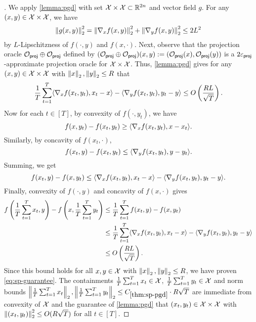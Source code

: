 \begin{proof}[]
We apply \cref{lemma:pgd} with set $\mathcal{X} \times \mathcal{X} \subset \mathbb{R}^{2n}$ and vector field $g$. For any $(x,y) \in \mathcal{X} \times \mathcal{X}$, we have
\[\left \lVert g(x,y) \right \rVert_2^2 = \left \lVert \nabla_x f(x,y) \right \rVert_2^2 + \left \lVert \nabla_y f(x,y) \right \rVert_2^2 \leq 2L^2\]
by $L$-Lipschitzness of $f(\cdot,y)$ and $f(x,\cdot)$. Next, observe that the projection oracle $\mathcal{O}_{\mathsf{proj}} \oplus \mathcal{O}_{\mathsf{proj}}$ defined by $(\mathcal{O}_{\mathsf{proj}} \oplus \mathcal{O}_{\mathsf{proj}})(x,y) := (\mathcal{O}_{\mathsf{proj}}(x),\mathcal{O}_{\mathsf{proj}}(y))$ is a $2\varepsilon_{\mathsf{proj}}$-approximate projection oracle for $\mathcal{X}\times\mathcal{X}$. Thus, \cref{lemma:pgd} gives for any $(x,y) \in \mathcal{X}\times\mathcal{X}$ with $\left \lVert x \right \rVert_2,\left \lVert y \right \rVert_2 \leq R$ that
\[\frac{1}{T}\sum_{t=1}^T \langle \nabla_x f(x_t,y_t), x_t - x\rangle - \langle \nabla_y f(x_t,y_t), y_t - y\rangle \leq O\left(\frac{RL}{\sqrt{T}}\right).\]
Now for each $t \in [T]$, by convexity of $f(\cdot,y_t)$, we have
\[f(x,y_t) - f(x_t,y_t) \geq \langle \nabla_x f(x_t,y_t), x - x_t\rangle.\]
Similarly, by concavity of $f(x_t,\cdot)$,
\[f(x_t, y) - f(x_t,y_t) \leq \langle \nabla_y f(x_t,y_t), y - y_t\rangle.\]
Summing, we get
\[f(x_t,y) - f(x,y_t) \leq \langle \nabla_x f(x_t,y_t), x_t - x\rangle - \langle \nabla_y f(x_t,y_t), y_t - y\rangle.\]
Finally, convexity of $f(\cdot,y)$ and concavity of $f(x,\cdot)$ gives
\begin{align}
f\left(\frac{1}{T}\sum_{t=1}^T x_t,y\right) - f\left(x,\frac{1}{T}\sum_{t=1}^T y_t\right) 
&\leq \frac{1}{T}\sum_{t=1}^T f(x_t,y) - f(x,y_t) \\ 
&\leq \frac{1}{T}\sum_{t=1}^T \langle \nabla_x f(x_t,y_t), x_t - x\rangle - \langle \nabla_y f(x_t,y_t), y_t - y\rangle \\
&\leq O\left(\frac{RL}{\sqrt{T}}\right).
\end{align}
Since this bound holds for all $x,y \in \mathcal{X}$ with $\left \lVert x \right \rVert_2,\left \lVert y \right \rVert_2 \leq R$, we have proven \cref{eq:sp-guarantee}. The containments $\frac{1}{T}\sum_{t=1}^T x_t \in \mathcal{X}$, $\frac{1}{T}\sum_{t=1}^T y_t \in \mathcal{X}$ and norm bounds $\left \lVert \frac{1}{T}\sum_{t=1}^T x_t \right \rVert_2,\left \lVert \frac{1}{T}\sum_{t=1}^T y_t \right \rVert_2 \leq C_{\ref{thm:sp-pgd}} \cdot R\sqrt{T}$ are immediate from convexity of $\mathcal{X}$ and the guarantee of \cref{lemma:pgd} that $(x_t,y_t) \in \mathcal{X}\times\mathcal{X}$ with $\left \lVert (x_t,y_t) \right \rVert_2^2 \leq O(R\sqrt{T})$ for all $t \in [T]$.\loose
\end{proof}
